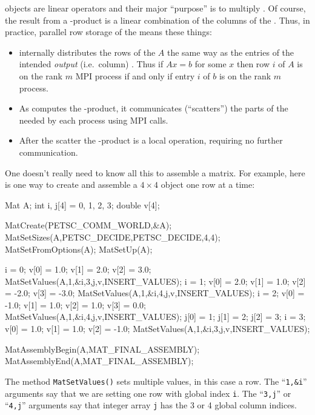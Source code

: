 \pMat objects are linear operators and their major ``purpose'' is to multiply \pVecs.  Of course, the result \pVec from a \pMat-\pVec product is a linear combination of the columns of the \pMat.  Thus, in practice, parallel row storage of the \pMat means these things:
\begin{itemize}
\item \PETSc internally distributes the rows of the \pMat $A$ the same way as the entries of the intended \emph{output} (i.e.~column) \pVec.  Thus if $Ax=b$ for some $x$ then row $i$ of $A$ is on the rank $m$ MPI process if and only if entry $i$ of $b$ is on the rank $m$ process.
\item As \PETSc computes the \pMat-\pVec product, it communicates (``scatters'') the parts of the \pVec needed by each process using MPI calls.
\item After the scatter the \pMat-\pVec product is a local operation, requiring no further communication.
\end{itemize}

One doesn't really need to know all this to assemble a matrix.  For example, here is one way to create and assemble a $4\times 4$ \pMat object one row at a time:
\begin{code}
Mat    A;
int    i, j[4] = {0, 1, 2, 3};
double v[4];

MatCreate(PETSC_COMM_WORLD,&A);
MatSetSizes(A,PETSC_DECIDE,PETSC_DECIDE,4,4);
MatSetFromOptions(A);
MatSetUp(A);

i = 0;  v[0] = 1.0;  v[1] = 2.0;  v[2] = 3.0;
MatSetValues(A,1,&i,3,j,v,INSERT_VALUES);
i = 1;  v[0] = 2.0;  v[1] = 1.0;  v[2] = -2.0;  v[3] = -3.0;
MatSetValues(A,1,&i,4,j,v,INSERT_VALUES);
i = 2;  v[0] = -1.0;  v[1] = 1.0;  v[2] = 1.0;  v[3] = 0.0;
MatSetValues(A,1,&i,4,j,v,INSERT_VALUES);
j[0] = 1;  j[1] = 2;  j[2] = 3;
i = 3;  v[0] = 1.0;  v[1] = 1.0;  v[2] = -1.0;
MatSetValues(A,1,&i,3,j,v,INSERT_VALUES);

MatAssemblyBegin(A,MAT_FINAL_ASSEMBLY);
MatAssemblyEnd(A,MAT_FINAL_ASSEMBLY);
\end{code}
The method \texttt{MatSetValues()} sets multiple values, in this case a row.  The ``\texttt{1,\&i}'' arguments say that we are setting one row with global index \texttt{i}.  The ``\texttt{3,j}'' or ``\texttt{4,j}'' arguments say that integer array \texttt{j} has the 3 or 4 global column indices.

